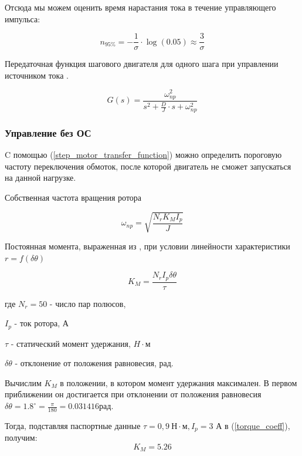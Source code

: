 Отсюда мы можем оценить время нарастания тока в течение управляющего импульса:

$$
    n_{ 95 \% } = - \frac{ 1 }{ \sigma }  \cdot \log{(0.05)} \approx \frac{ 3 }{ \sigma }
$$

Передаточная функция шагового двигателя для одного шага при управлении источником
тока \cite[гл. 4.2, ф-ла 4.65]{Kenio}.

\begin{equation}
    \label{step_motor_transfer_function}
    G(s) = \frac{ \omega_{np}^{2} }
                { s^{2} + \frac{D}{J} \cdot s + \omega_{np}^{2} }
\end{equation}

\newpage
\subsubsection{Управление без ОС}
C помощью (\ref{step_motor_transfer_function}) можно определить пороговую
частоту переключения обмоток, после которой двигатель не сможет запускаться на данной нагрузке.

Собственная частота вращения ротора \cite[гл. 4.2, ф-ла 4.48]{Kenio}

\begin{equation}
    \label{rotor_natural_frequency}
    \omega_{np} = \sqrt{\frac{N_{r}K_{M}I_{p}}{J}}
\end{equation}

Постоянная момента, выраженная из \cite[гл. 4.2, ф-ла 4.52]{Kenio}, при условии
линейности характеристики $r = f(\delta\theta)$

\begin{equation}
    \label{torque_coeff}
    K_{M} = \frac{N_{r}I_{p}\delta\theta}{\tau}
\end{equation}

где $N_{r} = 50$ - число пар полюсов,

$I_{p}$ - ток ротора, А

$\tau$ - статический момент удержания, $H \cdot \text{м}$

$\delta\theta$ - отклонение от положения равновесия, рад.
\newline

Вычислим $K_{M}$ в положении, в котором момент удержания максимален.
В первом приближении он достигается при отклонении от положения равновесия
$\delta\theta = 1.8^{\circ} = \frac{\pi}{180} = 0.031416 \text{рад}$.

Тогда, подставляя паспортные данные $\tau = 0,9 ~\text{Н} \cdot \text{м}, I_{p} = 3$ А
в (\ref{torque_coeff}), получим:
\begin{equation}
    \label{first_approximation_moment_coeff}
    K_{M} = 5.26
\end{equation}

